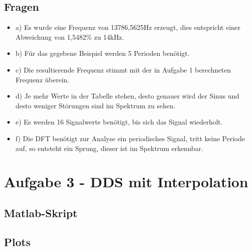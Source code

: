 \subsection{Fragen}
\begin{itemize}
\item{a)} Es wurde eine Frequenz von 13786,5625Hz erzeugt, dies entspricht einer Abweichung von 1,5482\% zu 14kHz.
\item{b)} Für das gegebene Beispiel werden 5 Perioden benötigt.
\item{c)} Die resultierende Frequenz stimmt mit der in Aufgabe 1 berechneten Frequenz überein.
\item{d)} Je mehr Werte in der Tabelle stehen, desto genauer wird der Sinus und desto weniger Störungen sind im Spektrum zu sehen.
\item{e)} Es werden 16 Signalwerte benötigt, bis sich das Signal wiederholt.
\item{f)} Die DFT benötigt zur Analyse ein periodisches Signal, tritt keine Periode auf, so entsteht ein Sprung, dieser ist im Spektrum erkennbar.
\end{itemize}

\newpage

\section{Aufgabe 3 - DDS mit Interpolation}

\subsection{Matlab-Skript}


\newpage

\subsection{Plots}

